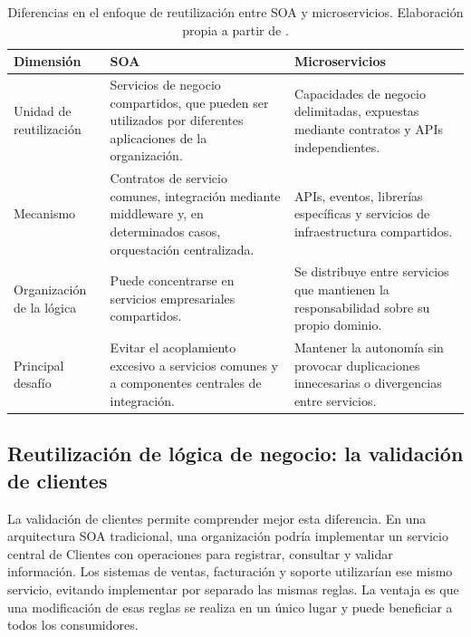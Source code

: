 \begin{table}[H]
    \centering
    \footnotesize
    \renewcommand{\arraystretch}{1.3}
    \begin{tabular}{@{}p{3.0cm} p{5.9cm} p{5.9cm}@{}}
        \toprule
        \textbf{Dimensión} & \textbf{SOA} & \textbf{Microservicios} \\
        \midrule
        Unidad de reutilización & Servicios de negocio compartidos, que pueden ser utilizados por diferentes aplicaciones de la organización. & Capacidades de negocio delimitadas, expuestas mediante contratos y APIs independientes. \\
        \addlinespace
        Mecanismo & Contratos de servicio comunes, integración mediante middleware y, en determinados casos, orquestación centralizada. & APIs, eventos, librerías específicas y servicios de infraestructura compartidos. \\
        \addlinespace
        Organización de la lógica & Puede concentrarse en servicios empresariales compartidos. & Se distribuye entre servicios que mantienen la responsabilidad sobre su propio dominio. \\
        \addlinespace
        Principal desafío & Evitar el acoplamiento excesivo a servicios comunes y a componentes centrales de integración. & Mantener la autonomía sin provocar duplicaciones innecesarias o divergencias entre servicios. \\
        \bottomrule
    \end{tabular}
    \caption{Diferencias en el enfoque de reutilización entre SOA y microservicios. Elaboración propia a partir de \parencite{richards2020fundamentals,ford2021hard}.}
    \label{tab:reutilizacion-soa-micro}
\end{table}

\subsection{Reutilización de lógica de negocio: la validación de clientes}

La validación de clientes permite comprender mejor esta diferencia. En una arquitectura SOA tradicional, una organización podría implementar un servicio central de Clientes con operaciones para registrar, consultar y validar información. Los sistemas de ventas, facturación y soporte utilizarían ese mismo servicio, evitando implementar por separado las mismas reglas. La ventaja es que una modificación de esas reglas se realiza en un único lugar y puede beneficiar a todos los consumidores.

